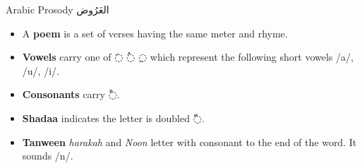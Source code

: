\begin{frame}[fragile]{Arabic Prosody \textarabic{العَرُوض}}

\begin{itemize}
	\item<1-> A \textbf{poem } is a set of verses having the same meter and rhyme.
	\item<2-> \textbf{Vowels}  carry one of \textarabic{◌َ  ◌ُ  ◌ِ} which represent the following short vowels /a/, /u/, /i/.
	\item<3-> \textbf{Consonants} carry \textarabic{◌ْ}.
	\item<4-> \textbf{Shadaa} indicates the letter is doubled \textarabic{◌ّ}. 
	\item<5-> \textbf{Tanween} \textit{harakah} and \textit{Noon} letter with consonant to the end of the word. It sounds /n/.
\end{itemize}

\end{frame}


